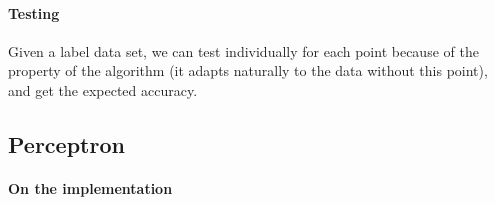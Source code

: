 \documentclass{article}
\begin{document}
\paragraph{Testing} Given a label data set, we can test individually
for each point because of the property of the algorithm (it adapts
naturally to the data without this point), and get the expected
accuracy.

\subsection{Perceptron}

\paragraph{On the implementation}

\printbibliography
\end{document}
